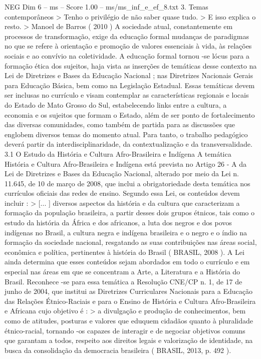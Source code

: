 \begin{textsample}{NEG Dim 6 – ms – Score 1.00 – ms/ms\_inf\_e\_ef\_8.txt}  \label{ex:f6_neg_233}
3.
Temas contemporâneos > Tenho o privilégio de não saber quase tudo. > E isso explica o resto. > Manoel de Barros ( 2010 ) A sociedade atual, constantemente em processos de transformação, exige da educação formal mudanças de paradigmas no que se refere à orientação e promoção de valores essenciais à vida, às relações sociais e ao convívio na coletividade.
A educação formal tornou -se lócus para a formação ética dos sujeitos, haja vista as inserções de temáticas desse contexto na Lei de Diretrizes e Bases da Educação Nacional ; nas Diretrizes Nacionais Gerais para Educação Básica, bem como na Legislação Estadual.
Essas temáticas devem ser inclusas no currículo e visam contemplar as características regionais e locais do Estado de Mato Grosso do Sul, estabelecendo links entre a cultura, a economia e os sujeitos que formam o Estado, além de ser ponto de fortalecimento das diversas comunidades, como também de partida para as discussões que englobem diversos temas do momento atual.
Para tanto, o trabalho pedagógico deverá partir da interdisciplinaridade, da contextualização e da transversalidade. 3.1 O Estudo da História e Cultura Afro-Brasileira e Indígena A temática História e Cultura Afro-Brasileira e Indígena está prevista no Artigo 26 - A da Lei de Diretrizes e Bases da Educação Nacional, alterado por meio da Lei n. 11.645, de 10 de março de 2008, que inclui a obrigatoriedade desta temática nos currículos oficiais das redes de ensino.
Segundo essa Lei, os conteúdos devem incluir : > [... ] diversos aspectos da história e da cultura que caracterizam a formação da população brasileira, a partir desses dois grupos étnicos, tais como o estudo da história da África e dos africanos, a luta dos negros e dos povos indígenas no Brasil, a cultura negra e indígena brasileira e o negro e o índio na formação da sociedade nacional, resgatando as suas contribuições nas áreas social, econômica e política, pertinentes à história do Brasil ( BRASIL, 2008 ).
A Lei ainda determina que esses conteúdos sejam abordados em todo o currículo e em especial nas áreas em que se concentram a Arte, a Literatura e a História do Brasil.
Reconhece -se para essa temática a Resolução CNE/CP n. 1, de 17 de junho de 2004, que institui as Diretrizes Curriculares Nacionais para a Educação das Relações Étnico-Raciais e para o Ensino de História e Cultura Afro-Brasileira e Africana cujo objetivo é : > a divulgação e produção de conhecimentos, bem como de atitudes, posturas e valores que eduquem cidadãos quanto à pluralidade étnico-racial, tornando -os capazes de interagir e de negociar objetivos comuns que garantam a todos, respeito aos direitos legais e valorização de identidade, na busca da consolidação da democracia brasileira ( BRASIL, 2013, p. 492 ).

\end{textsample}
